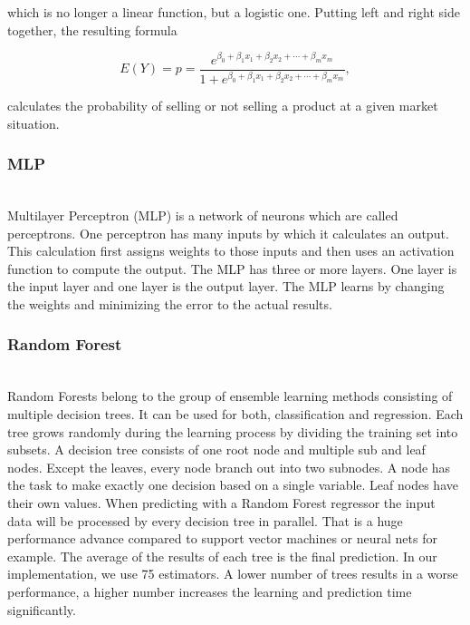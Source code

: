    which is no longer a linear function, but a logistic one. Putting left and right side together, the resulting formula

    \begin{equation}
    \label{eq.logreg.logsolved}
    E(Y) = p = \frac{e^{\beta _{0}+\beta _{1}x_{1}+\beta _{2}x_{2}+\cdots +\beta _{m}x_{m}}}{1+e^{\beta _{0}+\beta _{1}x_{1}+\beta _{2}x_{2}+\cdots +\beta _{m}x_{m}}},
    \end{equation}

    calculates the probability of selling or not selling a product at a given market situation.
    \nocite{logreg}
\subsubsection{MLP}
    ~\\
    Multilayer Perceptron (MLP) is a network of neurons which are called perceptrons. One perceptron has many inputs by which it calculates an output. This calculation first assigns weights to those inputs and then uses an activation function to compute the output. The MLP has three or more layers. One layer is the input layer and one layer is the output layer. The MLP learns by changing the weights and minimizing the error to the actual results.
\subsubsection{Random Forest}
    ~\\
    Random Forests belong to the group of ensemble learning methods consisting of multiple decision trees. It can be used for both, classification and regression. Each tree grows randomly during the learning process by dividing the training set into subsets. A decision tree consists of one root node and multiple sub and leaf nodes. Except the leaves, every node branch out into two subnodes. A node has the task to make exactly one decision based on a single variable. Leaf nodes have their own values. When predicting with a Random Forest regressor the input data will be processed by every decision tree in parallel. That is a huge performance advance compared to support vector machines or neural nets for example. The average of the results of each tree is the final prediction.
    In our implementation, we use 75 estimators. A lower number of trees results in a worse performance, a higher number increases the learning and prediction time significantly.
    \nocite{randfor}

